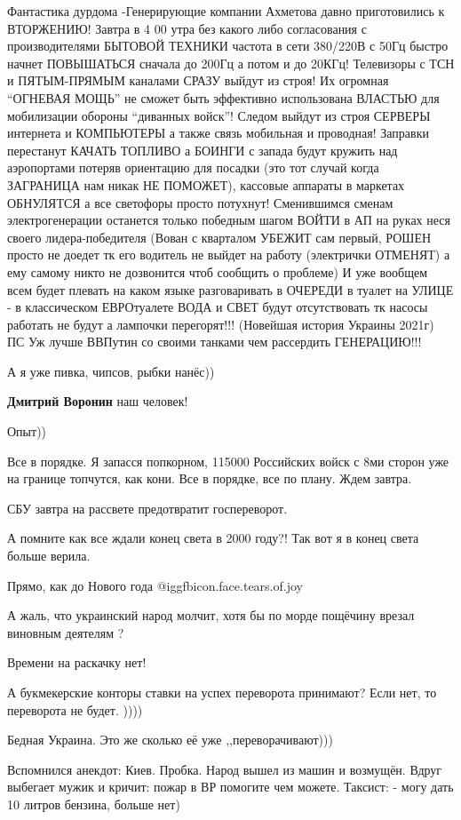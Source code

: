 \begin{itemize}
Фантастика дурдома -Генерирующие компании Ахметова давно приготовились к
ВТОРЖЕНИЮ! Завтра в 4 00 утра без какого либо согласования с производителями
БЫТОВОЙ ТЕХНИКИ частота в сети 380/220В с 50Гц быстро начнет ПОВЫШАТЬСЯ сначала
до 200Гц а потом и до 20КГц! Телевизоры с ТСН и ПЯТЫМ-ПРЯМЫМ каналами СРАЗУ
выйдут из строя! Их огромная \enquote{ОГНЕВАЯ МОЩЬ} не сможет быть эффективно
использована ВЛАСТЬЮ для мобилизации обороны \enquote{диванных войск}! Следом выйдут из
строя СЕРВЕРЫ интернета и КОМПЬЮТЕРЫ а также связь мобильная и проводная!
Заправки перестанут КАЧАТЬ ТОПЛИВО а БОИНГИ с запада будут кружить над
аэропортами потеряв ориентацию для посадки (это тот случай когда ЗАГРАНИЦА нам
никак НЕ ПОМОЖЕТ), кассовые аппараты в маркетах ОБНУЛЯТСЯ а все светофоры
просто потухнут! Сменившимся сменам электрогенерации останется только победным
шагом ВОЙТИ в АП на руках неся своего лидера-победителя (Вован с кварталом
УБЕЖИТ сам первый, РОШЕН просто не доедет тк его водитель не выйдет на
работу (электрички ОТМЕНЯТ) а ему самому никто не дозвонится чтоб сообщить о
проблеме) И уже вообщем всем будет плевать на каком языке разговаривать в
ОЧЕРЕДИ в туалет на УЛИЦЕ - в классическом ЕВРОтуалете ВОДА и СВЕТ будут
отсутствовать тк насосы работать не будут а лампочки перегорят!!! (Новейшая
история Украины 2021г) ПС Уж лучше ВВПутин со своими танками чем рассердить
ГЕНЕРАЦИЮ!!!

А я уже пивка, чипсов, рыбки нанёс))

\begin{itemize} %
\textbf{Дмитрий Воронин} наш человек!

Опыт))
\end{itemize} %


Все в порядке. Я запасся попкорном, 115000 Российских войск с 8ми сторон уже на
границе топчутся, как кони. Все в порядке, все по плану. Ждем завтра.

СБУ завтра на рассвете предотвратит госпереворот.

А помните как все ждали конец света в 2000 году?! Так вот я в конец света больше верила.

Прямо, как до Нового года  @igg{fbicon.face.tears.of.joy} 

А жаль, что украинский народ молчит, хотя бы по морде пощёчину врезал виновным деятелям ?

Времени на раскачку нет!

А букмекерские конторы ставки на успех переворота принимают? Если нет, то переворота не будет. ))))

Бедная Украина. Это же сколько её уже ,,переворачивают)))


Вспомнился анекдот: Киев. Пробка. Народ вышел из машин и возмущён. Вдруг
выбегает мужик и кричит: пожар в ВР помогите чем можете. Таксист: - могу дать
10 литров бензина, больше нет)

\end{itemize} %
